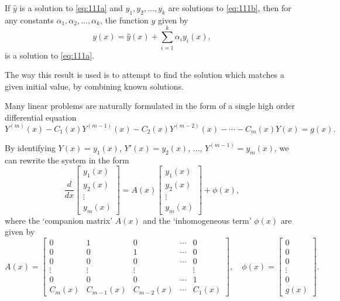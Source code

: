 \begin{theorem}

  \label{thm:111A}
If $\hat{y}$ is a solution to \eqref{eq:111a} and $y_1, y_2, \dots, y_k$ are solutions to \eqref{eq:111b}, then for any constants $\alpha_1, \alpha_2, \dots, \alpha_k$, the function $y$ given by
\[
y(x) = \hat{y}(x) + \sum_{i=1}^{k} \alpha_i y_i(x),
\]
is a solution to \eqref{eq:111a}.

The way this result is used is to attempt to find the solution which matches a given initial value, by combining known solutions.

Many linear problems are naturally formulated in the form of a single high order differential equation
\[
Y^{(m)}(x) - C_1(x) Y^{(m-1)}(x) - C_2(x) Y^{(m-2)}(x) - \cdots - C_m(x) Y(x) = g(x). \tag{111c}
\]

By identifying $Y(x) = y_1(x)$, $Y'(x) = y_2(x)$, $\dots$, $Y^{(m-1)} = y_m(x)$, we can rewrite the system in the form
\[
\frac{d}{dx} \begin{bmatrix} y_1(x) \\ y_2(x) \\ \vdots \\ y_m(x) \end{bmatrix} = A(x) \begin{bmatrix} y_1(x) \\ y_2(x) \\ \vdots \\ y_m(x) \end{bmatrix} + \phi(x),
\]
where the `companion matrix' $A(x)$ and the `inhomogeneous term' $\phi(x)$ are given by
\[
A(x) = \begin{bmatrix}
0 & 1 & 0 & \cdots & 0 \\
0 & 0 & 1 & \cdots & 0 \\
0 & 0 & 0 & \cdots & 0 \\
\vdots & \vdots & \vdots & & \vdots \\
0 & 0 & 0 & \cdots & 1 \\
C_m(x) & C_{m-1}(x) & C_{m-2}(x) & \cdots & C_1(x)
\end{bmatrix}, \quad \phi(x) = \begin{bmatrix} 0 \\ 0 \\ 0 \\ \vdots \\ 0 \\ g(x) \end{bmatrix}.
\]


\end{theorem}
